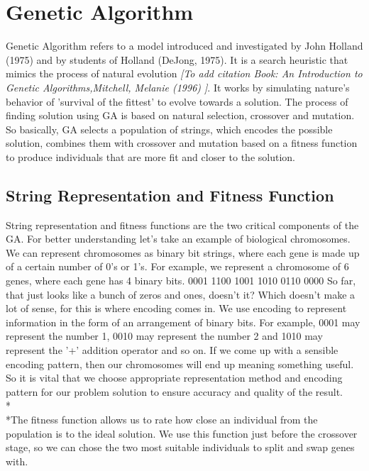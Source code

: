 \newcommand{\tab}{\hspace*{2em}}

\section*{Genetic Algorithm}
Genetic Algorithm refers to a model introduced and investigated by John Holland (1975) and
by students of Holland (DeJong, 1975). It is a search heuristic that mimics the process of natural 
evolution \emph{[To add citation Book: An Introduction to Genetic Algorithms,Mitchell, Melanie (1996) ]}.
It works by simulating nature's behavior of 'survival of 
the fittest' to evolve towards a solution. The process of finding solution using GA is based on 
natural selection, crossover and mutation. So basically, GA selects a population of strings, which 
encodes the possible solution, combines them with crossover and mutation based on a fitness function 
to produce individuals that are more fit and closer to the solution. 

\subsection*{String Representation and Fitness Function}
String representation and fitness functions are the two critical components of the GA. For better understanding let’s take an example of biological chromosomes. We can represent chromosomes as binary bit strings, where each gene is made up of a certain number of 0’s or 1’s. For example, we represent a chromosome of 6 genes, where each gene has 4 binary bits. 0001 1100 1001 1010 0110 0000 So far, that just looks like a bunch of zeros and ones, doesn’t it? Which doesn’t make a lot of sense, for this is where encoding comes in. We use encoding to represent information in the form of an arrangement of binary bits. For example, 0001 may represent the number 1, 0010 may represent the number 2 and 1010 may represent the ’+’ addition operator and so on. If we come up with a sensible encoding pattern, then our chromosomes will end up meaning something useful. So it is vital that we choose appropriate representation method and encoding pattern for our problem solution to ensure accuracy and quality of the result. 
\\*\\*The fitness function allows us to rate how close an individual from the population is to the ideal solution. We use this function just before the crossover stage, so we can chose the two most suitable individuals to split and swap genes with. 

